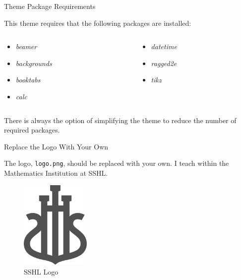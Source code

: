 \documentclass[newPxFont,numfooter,sectionpages]{beamer}
\begin{document}
    \begin{frame}{Theme Package Requirements}
    
    This theme requires that the following packages are installed:
    
    \begin{columns}[t]
    \begin{column}{0.5\textwidth}
    \begin{itemize}
    \item \emph{beamer}
    \item \emph{backgrounds}
    \item \emph{booktabs}
    \item \emph{calc}
    \end{itemize}
    \end{column}
    
    \begin{column}{0.5\textwidth}
    \begin{itemize}
    \item \emph{datetime}
    \item \emph{ragged2e}
    \item \emph{tikz}
    \end{itemize}
    \end{column}
    \end{columns}
    \vspace{1cm}
    There is always the option of simplifying the theme to reduce the number of required packages. 
    
    \end{frame}
    
    
    \begin{frame}{Replace the Logo With Your Own}
    
    The  logo, \texttt{logo.png}, should be replaced with your own.  I teach within the Mathematics Institution at SSHL.
    \vspace{1cm}
    \begin{figure}
        \centerline{\includegraphics[width=0.3\textwidth]{images/logo.png}}
    \caption{SSHL Logo}
    \end{figure}
    
    \end{frame}
    
\end{document}
